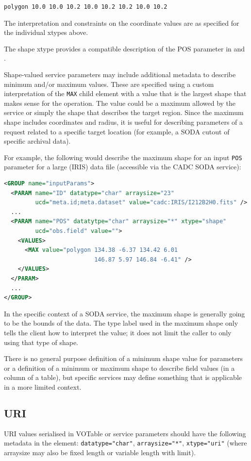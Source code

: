 \documentclass[11pt,letter]{ivoa}
\begin{document}
\begin{verbatim}
polygon 10.0 10.0 10.2 10.0 10.2 10.2 10.0 10.2
\end{verbatim}

The interpretation and constraints on the coordinate values are as specified 
for the individual xtypes above.

The shape xtype provides a compatible description of the POS parameter in
\citep{2015ivoa.spec.1223D} and \citep{2017ivoa.spec.0517B}.

Shape-valued service parameters may include additional metadata to describe minimum
and/or maximum values. These are specified using a custom interpretation of the
\verb|MAX| child element with a value that is the largest shape that makes sense
for the operation. The value could be a maximum allowed by the service or simply
the shape that describes the target region. Since the maximum shape includes
coordinates and radius, it is useful for describing parameters of a request related
to a specific target location (for example, a SODA cutout of specific archival data).

For example, the following would describe the maximum shape for an input \verb|POS|
parameter for a large (IRIS) data file (accessible via the CADC SODA service):
\begin{lstlisting}[language=XML]
<GROUP name="inputParams">
  <PARAM name="ID" datatype="char" arraysize="23"
         ucd="meta.id;meta.dataset" value="cadc:IRIS/I212B2H0.fits" />
  ...
  <PARAM name="POS" datatytpe="char" arraysize="*" xtype="shape"
         ucd="obs.field" value="">
    <VALUES>
      <MAX value="polygon 134.38 -6.37 134.42 6.01
                          146.87 5.97 146.84 -6.41" />
    </VALUES>
  </PARAM>
  ...
</GROUP>
\end{lstlisting}
In the specific context of a SODA service, the maximum shape is generally going
to be the bounds of the data. The type label used in the maximum shape only tells
the client how to interpret the value; it does not limit the caller to only using
that type of shape.

There is no general purpose definition of a minimum shape value for parameters or
a definition of a minimum or maximum shape to describe field values (in a column
of a table), but specific services may define something that is applicable in a
more limited context.

\subsection{URI}
URI values \citep{std:RFC3986} serialised in VOTable or service parameters 
should have the following metadata in the  element: \verb|datatype="char"|, 
\verb|arraysize="*"|, \verb|xtype="uri"| (where arraysize may also be fixed length or 
variable length with limit).
\end{document}
